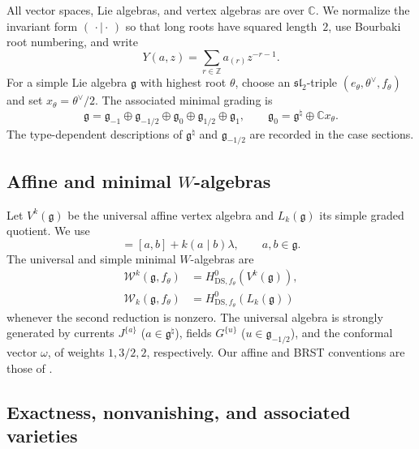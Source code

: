 \documentclass[11pt,reqno]{amsart}
\theoremstyle{definition}
\theoremstyle{remark}
\begin{document}
All vector spaces, Lie algebras, and vertex algebras are over $\mathbb C$.
We normalize the invariant form $(\,\cdot\mid\cdot\,)$ so that long roots
have squared length~$2$, use Bourbaki root numbering, and write
\[
  Y(a,z)=\sum_{r\in\mathbb Z}a_{(r)}z^{-r-1}.
\]
For a simple Lie algebra $\mathfrak g$ with highest root $\theta$, choose an
$\mathfrak{sl}_2$-triple $(e_\theta,\theta^\vee,f_\theta)$ and set
$x_\theta=\theta^\vee/2$.  The associated minimal grading is
\begin{equation*}
  \mathfrak g=\mathfrak g_{-1}\oplus\mathfrak g_{-1/2}
  \oplus\mathfrak g_0\oplus\mathfrak g_{1/2}\oplus\mathfrak g_1,
  \qquad
  \mathfrak g_0=\mathfrak g^\natural\oplus\mathbb Cx_\theta.
\end{equation*}
The type-dependent descriptions of $\mathfrak g^\natural$ and
$\mathfrak g_{-1/2}$ are recorded in the case sections.

\subsection{Affine and minimal \texorpdfstring{$W$}{W}-algebras}

Let $V^k(\mathfrak g)$ be the universal affine vertex algebra and
$L_k(\mathfrak g)$ its simple graded quotient.  We use
\begin{equation*}
  [a_\lambda b]=[a,b]+k(a\mid b)\lambda,
  \qquad a,b\in\mathfrak g.
\end{equation*}
The universal and simple minimal $W$-algebras are
\begin{align*}
  \mathcal W^k(\mathfrak g,f_\theta)
  &=H^0_{\mathrm{DS},f_\theta}\!\left(V^k(\mathfrak g)\right),\\
  \mathcal W_k(\mathfrak g,f_\theta)
  &=H^0_{\mathrm{DS},f_\theta}\!\left(L_k(\mathfrak g)\right)
\end{align*}
whenever the second reduction is nonzero.  The universal algebra is strongly
generated by currents $J^{\{a\}}$ ($a\in\mathfrak g^\natural$), fields
$G^{\{u\}}$ ($u\in\mathfrak g_{-1/2}$), and the conformal vector $\omega$,
of weights $1,3/2,2$, respectively.  Our affine and BRST conventions are
those of \cite{Kac1998,FrenkelBenZvi2004,KacRoanWakimoto2003,
KacWakimoto2004,KacWakimoto2005,Arakawa2007}.

\subsection{Exactness, nonvanishing, and associated varieties}
\label{subsec:common-DS}
\end{document}
